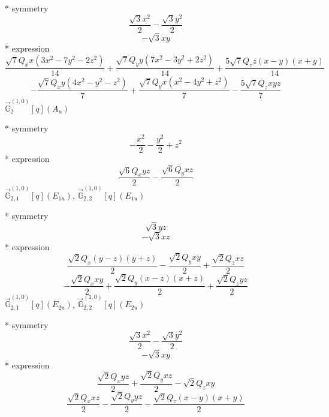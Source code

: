 \documentclass[fleqn,8pt]{jsarticle}
\begin{document}
\noindent\quad ** symmetry
\begin{dmath*}
\frac{\sqrt{3} x^{2}}{2} - \frac{\sqrt{3} y^{2}}{2}
\end{dmath*}
\begin{dmath*}
- \sqrt{3} x y
\end{dmath*}
\noindent\quad ** expression
\begin{dmath*}
\frac{\sqrt{7} Q_{x} x \left(3 x^{2} - 7 y^{2} - 2 z^{2}\right)}{14} + \frac{\sqrt{7} Q_{y} y \left(7 x^{2} - 3 y^{2} + 2 z^{2}\right)}{14} + \frac{5 \sqrt{7} Q_{z} z \left(x - y\right) \left(x + y\right)}{14}
\end{dmath*}
\begin{dmath*}
- \frac{\sqrt{7} Q_{x} y \left(4 x^{2} - y^{2} - z^{2}\right)}{7} + \frac{\sqrt{7} Q_{y} x \left(x^{2} - 4 y^{2} + z^{2}\right)}{7} - \frac{5 \sqrt{7} Q_{z} x y z}{7}
\end{dmath*}
\noindent\quad $\vec{\mathbb{G}}_{2}^{(1,0)}[q](A_{u})$

\noindent\quad ** symmetry
\begin{dmath*}
- \frac{x^{2}}{2} - \frac{y^{2}}{2} + z^{2}
\end{dmath*}
\noindent\quad ** expression
\begin{dmath*}
\frac{\sqrt{6} Q_{x} y z}{2} - \frac{\sqrt{6} Q_{y} x z}{2}
\end{dmath*}
\noindent\quad $\vec{\mathbb{G}}_{2,1}^{(1,0)}[q](E_{1u})$, $\vec{\mathbb{G}}_{2,2}^{(1,0)}[q](E_{1u})$

\noindent\quad ** symmetry
\begin{dmath*}
\sqrt{3} y z
\end{dmath*}
\begin{dmath*}
- \sqrt{3} x z
\end{dmath*}
\noindent\quad ** expression
\begin{dmath*}
\frac{\sqrt{2} Q_{x} \left(y - z\right) \left(y + z\right)}{2} - \frac{\sqrt{2} Q_{y} x y}{2} + \frac{\sqrt{2} Q_{z} x z}{2}
\end{dmath*}
\begin{dmath*}
- \frac{\sqrt{2} Q_{x} x y}{2} + \frac{\sqrt{2} Q_{y} \left(x - z\right) \left(x + z\right)}{2} + \frac{\sqrt{2} Q_{z} y z}{2}
\end{dmath*}
\noindent\quad $\vec{\mathbb{G}}_{2,1}^{(1,0)}[q](E_{2u})$, $\vec{\mathbb{G}}_{2,2}^{(1,0)}[q](E_{2u})$

\noindent\quad ** symmetry
\begin{dmath*}
\frac{\sqrt{3} x^{2}}{2} - \frac{\sqrt{3} y^{2}}{2}
\end{dmath*}
\begin{dmath*}
- \sqrt{3} x y
\end{dmath*}
\noindent\quad ** expression
\begin{dmath*}
\frac{\sqrt{2} Q_{x} y z}{2} + \frac{\sqrt{2} Q_{y} x z}{2} - \sqrt{2} Q_{z} x y
\end{dmath*}
\begin{dmath*}
\frac{\sqrt{2} Q_{x} x z}{2} - \frac{\sqrt{2} Q_{y} y z}{2} - \frac{\sqrt{2} Q_{z} \left(x - y\right) \left(x + y\right)}{2}
\end{dmath*}
\end{document}
